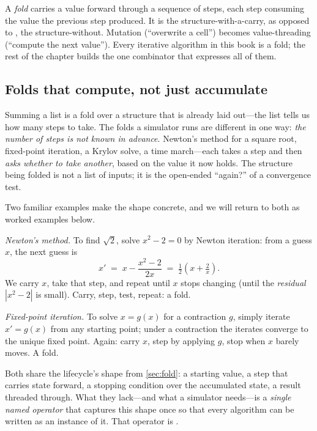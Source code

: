\begin{keyidea}
A \emph{fold} carries a value forward through a sequence of steps, each step
consuming the value the previous step produced. It is the structure-with-a-carry,
as opposed to , the structure-without. Mutation (``overwrite a cell'')
becomes value-threading (``compute the next value''). Every iterative algorithm
in this book is a fold; the rest of the chapter builds the one combinator that
expresses all of them.
\end{keyidea}

\subsection{Folds that compute, not just accumulate}

Summing a list is a fold over a structure that is already laid out---the list
tells us how many steps to take. The folds a simulator runs are different in one
way: \emph{the number of steps is not known in advance}. Newton's method for a
square root, fixed-point iteration, a Krylov solve, a time march---each takes a
step and then \emph{asks whether to take another}, based on the value it now
holds. The structure being folded is not a list of inputs; it is the open-ended
``again?'' of a convergence test.

Two familiar examples make the shape concrete, and we will return to both as
worked examples below.

\emph{Newton's method.} To find $\sqrt{2}$, solve $x^2 - 2 = 0$ by Newton
iteration: from a guess $x$, the next guess is
\[
  x' \;=\; x - \frac{x^2 - 2}{2x} \;=\; \tfrac{1}{2}\!\left(x + \tfrac{2}{x}\right).
\]
We carry $x$, take that step, and repeat until $x$ stops changing (until the
\emph{residual} $|x^2 - 2|$ is small). Carry, step, test, repeat: a fold.

\emph{Fixed-point iteration.} To solve $x = g(x)$ for a contraction $g$, simply
iterate $x' = g(x)$ from any starting point; under a contraction the iterates
converge to the unique fixed point. Again: carry $x$, step by applying $g$, stop
when $x$ barely moves. A fold.

Both share the lifecycle's shape from \cref{sec:fold}: a starting value, a step
that carries state forward, a stopping condition over the accumulated state, a
result threaded through. What they lack---and what a simulator needs---is a
\emph{single named operator} that captures this shape once so that every
algorithm can be written as an instance of it. That operator is
.

